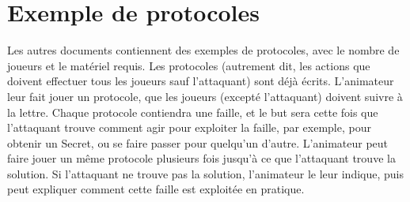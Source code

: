 \documentclass[a4paper,10pt]{article}
\begin{document}
\section{Exemple de protocoles}
Les autres documents contiennent des exemples de protocoles, avec le nombre de joueurs et le matériel requis. Les protocoles (autrement dit, les actions que doivent effectuer tous les joueurs sauf l'attaquant) sont déjà écrits. L'animateur leur fait jouer un protocole, que les joueurs (excepté l'attaquant) doivent suivre à la lettre. Chaque protocole contiendra une faille, et le but sera cette fois que l'attaquant trouve comment agir pour exploiter la faille, par exemple, pour obtenir un Secret, ou se faire passer pour quelqu'un d'autre. L'animateur peut faire jouer un même protocole plusieurs fois jusqu'à ce que l'attaquant trouve la solution. Si l'attaquant ne trouve pas la solution, l'animateur le leur indique, puis peut expliquer comment cette faille est exploitée en pratique.
\end{document}
